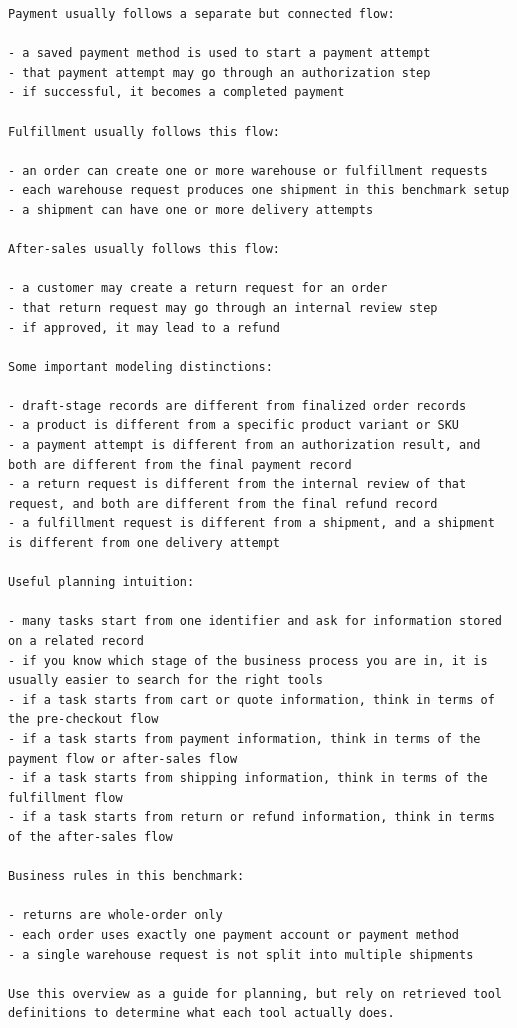 \begin{center}
\begin{tcolorbox}
\begin{lstlisting}[basicstyle=\ttfamily\footnotesize,breaklines=true,columns=fullflexible,keepspaces=true]
Payment usually follows a separate but connected flow:

- a saved payment method is used to start a payment attempt
- that payment attempt may go through an authorization step
- if successful, it becomes a completed payment

Fulfillment usually follows this flow:

- an order can create one or more warehouse or fulfillment requests
- each warehouse request produces one shipment in this benchmark setup
- a shipment can have one or more delivery attempts

After-sales usually follows this flow:

- a customer may create a return request for an order
- that return request may go through an internal review step
- if approved, it may lead to a refund

Some important modeling distinctions:

- draft-stage records are different from finalized order records
- a product is different from a specific product variant or SKU
- a payment attempt is different from an authorization result, and both are different from the final payment record
- a return request is different from the internal review of that request, and both are different from the final refund record
- a fulfillment request is different from a shipment, and a shipment is different from one delivery attempt

Useful planning intuition:

- many tasks start from one identifier and ask for information stored on a related record
- if you know which stage of the business process you are in, it is usually easier to search for the right tools
- if a task starts from cart or quote information, think in terms of the pre-checkout flow
- if a task starts from payment information, think in terms of the payment flow or after-sales flow
- if a task starts from shipping information, think in terms of the fulfillment flow
- if a task starts from return or refund information, think in terms of the after-sales flow

Business rules in this benchmark:

- returns are whole-order only
- each order uses exactly one payment account or payment method
- a single warehouse request is not split into multiple shipments

Use this overview as a guide for planning, but rely on retrieved tool definitions to determine what each tool actually does.


\end{lstlisting}
\end{tcolorbox}
\end{center}
